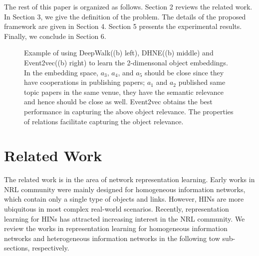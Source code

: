 The rest of this paper is organized as follows. Section 2 reviews the related work. In Section 3, we give the definition of the problem. The details of the proposed framework are given in Section 4. Section 5 presents the experimental results. Finally, we conclude in Section 6.

\begin{figure*}
	\centering
	\caption{{\small Example of using DeepWalk((b) left), DHNE((b) middle) and Event2vec((b) right) to learn the 2-dimensonal object embeddings. In the embedding space, $a_3$, $a_4$, and $a_5$ should be close since they have cooperations in publishing papers; $a_1$ and $a_2$ published same topic papers in the same venue, they have the semantic relevance and hence should be close as well. Event2vec obtains the best performance in capturing the above object relevance. The properties of relations facilitate capturing the object relevance.}}\label{figure3}
\end{figure*}

\section{Related Work}
The related work is in the area of network representation learning. Early works in NRL community were mainly designed for homogeneous information networks, which contain only a single type of objects and links. However, HINs are more ubiquitous in most complex real-world scenarios. Recently, representation learning for HINs has attracted increasing interest in the NRL community. We review the works in representation learning for homogeneous information networks and heterogeneous information networks in the following tow sub-sections, respectively.

